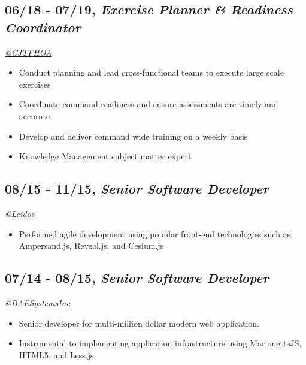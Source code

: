\documentclass[10pt]{article}
\def\tightlist{}
\begin{document}
\hypertarget{exercise-planner-readiness-coordinator}{%
\subsection{\texorpdfstring{06/18 - 07/19, \textbf{\emph{Exercise
Planner \& Readiness
Coordinator}}}{06/18 - 07/19, Exercise Planner \& Readiness Coordinator}}\label{exercise-planner-readiness-coordinator}}

\emph{\href{https://twitter.com/CJTFHOA}{@CJTFHOA}}

\begin{itemize}
\tightlist
\item
  Conduct planning and lead cross-functional teams to execute large
  scale exercises
\item
  Coordinate command readiness and ensure assessments are timely and
  accurate
\item
  Develop and deliver command wide training on a weekly basis
\item
  Knowledge Management subject matter expert
\end{itemize}

\hypertarget{senior-software-developer}{%
\subsection{\texorpdfstring{08/15 - 11/15, \textbf{\emph{Senior Software
Developer}}}{08/15 - 11/15, Senior Software Developer}}\label{senior-software-developer}}

\emph{\href{https://twitter.com/LeidosInc}{@Leidos}}

\begin{itemize}
\tightlist
\item
  Performed agile development using popular front-end technologies such
  as: Ampersand.js, Reveal.js, and Cesium.js
\end{itemize}

\hypertarget{senior-software-developer-1}{%
\subsection{\texorpdfstring{07/14 - 08/15, \textbf{\emph{Senior Software
Developer}}}{07/14 - 08/15, Senior Software Developer}}\label{senior-software-developer-1}}

\emph{\href{https://twitter.com/BAESystemsInc}{@BAESystemsInc}}

\begin{itemize}
\tightlist
\item
  Senior developer for multi-million dollar modern web application.
\item
  Instrumental to implementing application infrastructure using
  MarionetteJS, HTML5, and Less.js
\end{itemize}
\end{document}
